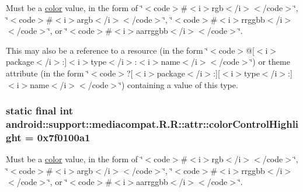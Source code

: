 Must be a \hyperlink{classandroid_1_1support_1_1mediacompat_1_1_r_1_1color}{color} value, in the form of \char`\"{}$<$code$>$\#$<$i$>$rgb$<$/i$>$$<$/code$>$\char`\"{}, \char`\"{}$<$code$>$\#$<$i$>$argb$<$/i$>$$<$/code$>$\char`\"{}, \char`\"{}$<$code$>$\#$<$i$>$rrggbb$<$/i$>$$<$/code$>$\char`\"{}, or \char`\"{}$<$code$>$\#$<$i$>$aarrggbb$<$/i$>$$<$/code$>$\char`\"{}. 

This may also be a reference to a resource (in the form \char`\"{}$<$code$>$@\mbox{[}$<$i$>$package$<$/i$>$:\mbox{]}$<$i$>$type$<$/i$>$:$<$i$>$name$<$/i$>$$<$/code$>$\char`\"{}) or theme attribute (in the form \char`\"{}$<$code$>$?\mbox{[}$<$i$>$package$<$/i$>$:\mbox{]}\mbox{[}$<$i$>$type$<$/i$>$:\mbox{]}$<$i$>$name$<$/i$>$$<$/code$>$\char`\"{}) containing a value of this type. \hypertarget{classandroid_1_1support_1_1mediacompat_1_1_r_1_1attr_c33494a792895e76182a5b2dd08bd3f4}{
\subsubsection[{colorControlHighlight}]{\setlength{\rightskip}{0pt plus 5cm}static final int android::support::mediacompat.R.R::attr::colorControlHighlight = 0x7f0100a1}}
\label{classandroid_1_1support_1_1mediacompat_1_1_r_1_1attr_c33494a792895e76182a5b2dd08bd3f4}


Must be a \hyperlink{classandroid_1_1support_1_1mediacompat_1_1_r_1_1color}{color} value, in the form of \char`\"{}$<$code$>$\#$<$i$>$rgb$<$/i$>$$<$/code$>$\char`\"{}, \char`\"{}$<$code$>$\#$<$i$>$argb$<$/i$>$$<$/code$>$\char`\"{}, \char`\"{}$<$code$>$\#$<$i$>$rrggbb$<$/i$>$$<$/code$>$\char`\"{}, or \char`\"{}$<$code$>$\#$<$i$>$aarrggbb$<$/i$>$$<$/code$>$\char`\"{}. 

